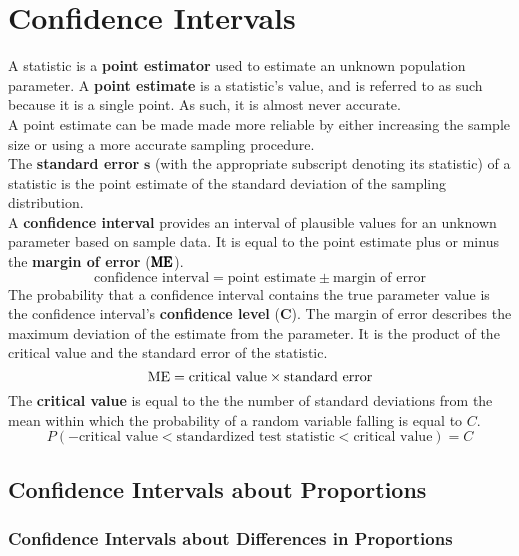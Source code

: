 \documentclass[../AP_Statistics.tex]{subfiles}
\begin{document}
	\chapter{Confidence Intervals}
		A statistic is a \textbf{point estimator} used to estimate an unknown population parameter. A \textbf{point estimate} is a statistic's value, and is referred to as such because it is a single point. As such, it is almost never accurate. \\
		A point estimate can be made made more reliable by either increasing the sample size or using a more accurate sampling procedure. \\
		The \textbf{standard error} $\pmb{s}$ (with the appropriate subscript denoting its statistic) of a statistic is the point estimate of the standard deviation of the sampling distribution. \\
		A \textbf{confidence interval} provides an interval of plausible values for an unknown parameter based on sample data. It is equal to the point estimate plus or minus the \textbf{margin of error} ($\pmb{\operatorname{ME}}$).
		\[\text{confidence interval} = \text{point estimate} \pm \text{margin of error}\]
		The probability that a confidence interval contains the true parameter value is the confidence interval's \textbf{confidence level} ($\pmb{C}$).
		The margin of error describes the maximum deviation of the estimate from the parameter. It is the product of the critical value and the standard error of the statistic.
		\[\operatorname{ME} = \text{critical value} \times \text{standard error}\]
		The \textbf{critical value} is equal to the the number of standard deviations from the mean within which the probability of a random variable falling is equal to $C$.
		\[P(-\text{critical value} < \text{standardized test statistic} < \text{critical value}) = C\]
		\section{Confidence Intervals about Proportions}
			\subsection*{Confidence Intervals about Differences in Proportions}
\end{document}
